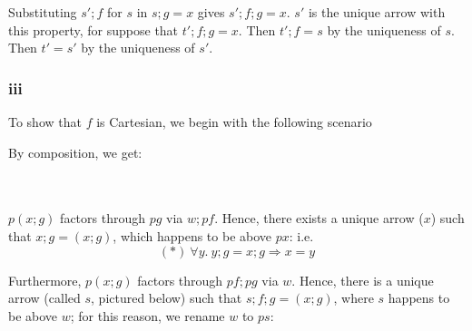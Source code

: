 \documentclass{article}
\begin{document}
Substituting $s';f$ for $s$ in $s;g = x$ gives $s';f;g = x$. $s'$ is the unique arrow with 
this property, for suppose that $t';f;g = x$. Then $t';f = s$ by the uniqueness of $s$.
Then $t' = s'$ by the uniqueness of $s'$.  

\subsubsection*{iii}

To show that $f$ is Cartesian, we begin with the following scenario


By composition, we get:

\\~\\

$p(x;g)$ factors through $pg$ via $w;pf$. Hence, there exists a unique arrow ($x$) 
such that $x;g = (x;g)$, which happens to be above $px$: i.e. $$(*)~\forall y .~ y;g=x;g \Rightarrow x=y$$

Furthermore, $p(x;g)$ factors through $pf;pg$ via $w$. Hence, there is a unique arrow (called $s$, pictured below)
such that $s;f;g = (x;g)$, where $s$ happens to be above $w$; for this reason, we rename $w$ to $ps$:

\\~\\
\end{document}
